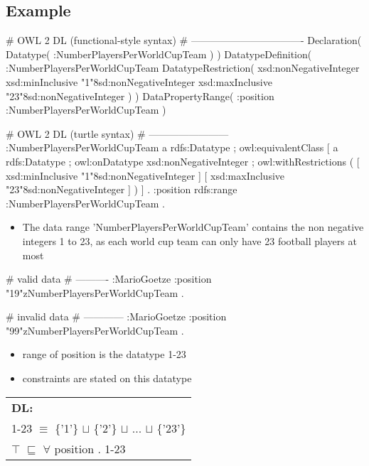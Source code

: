 \documentclass{llncs}
\newenvironment{DL}{
  \scriptsize
  \sffamily
  \vspace{0.3cm}
  \begin{tabular}{l}
	\textbf{DL:} \\

}{
  \end{tabular}
  \linebreak
}
\begin{document}
\subsection{Example}

\begin{ex}
# OWL 2 DL (functional-style syntax)
# ----------------------------------
Declaration( Datatype( :NumberPlayersPerWorldCupTeam ) ) 
DatatypeDefinition( 
    :NumberPlayersPerWorldCupTeam
    DatatypeRestriction( 
        xsd:nonNegativeInteger 
        xsd:minInclusive "1"^^xsd:nonNegativeInteger 
        xsd:maxInclusive "23"^^xsd:nonNegativeInteger ) )     
DataPropertyRange( :position :NumberPlayersPerWorldCupTeam ) 
\end{ex}

\begin{ex}
# OWL 2 DL (turtle syntax)
# ------------------------
:NumberPlayersPerWorldCupTeam
    a rdfs:Datatype ;
    owl:equivalentClass [
        a rdfs:Datatype ;
        owl:onDatatype xsd:nonNegativeInteger ;
        owl:withRestrictions ( 
            [ xsd:minInclusive "1"^^xsd:nonNegativeInteger ]
            [ xsd:maxInclusive "23"^^xsd:nonNegativeInteger ] ) ] .
:position rdfs:range :NumberPlayersPerWorldCupTeam .
\end{ex}

\begin{itemize}
	\item The data range 'NumberPlayersPerWorldCupTeam' contains the non negative integers 1 to 23, as each world cup team can only have 23 football players at most
\end{itemize}

\begin{ex}
# valid data
# ----------
:MarioGoetze
    :position "19"^^:NumberPlayersPerWorldCupTeam .
\end{ex}

\begin{ex}
# invalid data
# ------------
:MarioGoetze
    :position "99"^^:NumberPlayersPerWorldCupTeam .
\end{ex}

\begin{itemize}
	\item range of position is the datatype 1-23
  \item constraints are stated on this datatype
\end{itemize}

\begin{DL}
1-23 $\equiv$ \{'1'\} $\sqcup$ \{'2'\} $\sqcup$ ... $\sqcup$ \{'23'\} \\
$\top$ $\sqsubseteq$ $\forall$ position . 1-23 \\
\end{DL}
\end{document}

